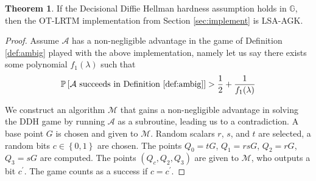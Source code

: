 \documentclass{mrl}
\theoremstyle{definition}
\newtheorem{theorem}{Theorem}[subsection]
\begin{document}
  \begin{theorem} If the Decisional Diffie Hellman hardness assumption holds in $\mathbb{G}$, then the OT-LRTM implementation from Section \ref{sec:implement} is LSA-AGK.
  \end{theorem}
  \begin{proof}
  Assume $\mathcal{A}$ has a non-negligible advantage in the game of Definition \ref{def:ambig} played with the above implementation, namely let us say there exists some polynomial $f_1(\lambda)$ such that 
  \[\mathbb{P}\left[\mathcal{A}\text{ succeeds in Definition \ref{def:ambig}}\right] > \frac{1}{2} + \frac{1}{f_1(\lambda)}\]
  
  
  We construct an algorithm $\mathcal{M}$ that gains a non-negligible advantage in solving the DDH game by running $\mathcal{A}$ as a subroutine, leading us to a contradiction.  A base point $G$ is chosen and given to $\mathcal{M}$. Random scalars $r$, $s$, and $t$ are selected, a random bits $c \in \left\{0,1\right\}$ are chosen. The points $Q_0 = tG$, $Q_1 = rsG$, $Q_2 = rG$, $Q_3 = sG$ are computed. The points $(Q_c, Q_2,Q_3)$ are given to $\mathcal{M}$, who outputs a bit $c^{\prime}$. The game counts as a success if $c=c^{\prime}$.    
  

\end{proof}
\end{document}
